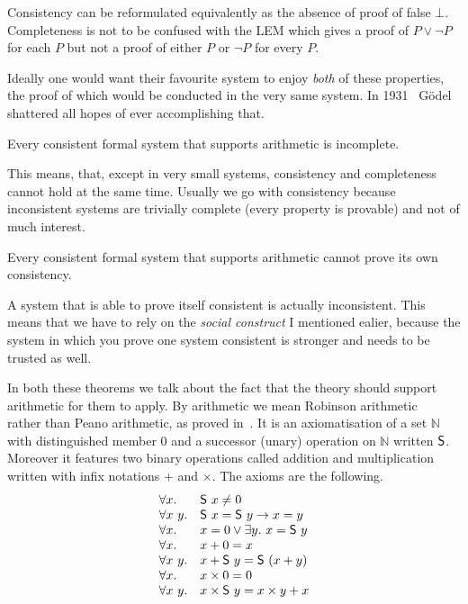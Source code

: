 Consistency can be reformulated equivalently as the absence of proof of false
\(\bot\).
Completeness is not to be confused with the \acrshort{LEM} which gives a proof
of \(P \vee \neg P\) for each \(P\) but not a proof of either \(P\) or
\(\neg P\) for every \(P\).

Ideally one would want their favourite system to enjoy \emph{both} of these
properties, the proof of which would be conducted in the very same system.
In 1931~ Gödel shattered all hopes of ever
accomplishing that.

\begin{theorem}
  Every consistent formal system that supports arithmetic is incomplete.
\end{theorem}

This means, that, except in very small systems, consistency and completeness
cannot hold at the same time. Usually we go with consistency because
inconsistent systems are trivially complete (every property is provable) and not
of much interest.

\begin{theorem}
  Every consistent formal system that supports arithmetic cannot prove its
  own consistency.
\end{theorem}
A system that is able to prove itself consistent is actually inconsistent.
This means that we have to rely on the \emph{social construct} I mentioned
ealier, because the system in which you prove one system consistent is stronger
and needs to be trusted as well.

In both these theorems we talk about the fact that the theory should support
arithmetic for them to apply. By arithmetic we mean Robinson
arithmetic~ rather than Peano arithmetic,
as proved in~.
It is an axiomatisation of a set \(\mathbb{N}\) with distinguished member
\(0\) and a successor (unary) operation on \(\mathbb{N}\) written \(\mathsf{S}\).
Moreover it features two binary operations called addition and multiplication
written with infix notations \(+\) and \(\times\).
The axioms are the following.
\[
  \begin{array}{ll}
    \forall x.& \mathsf{S}\ x \not= 0 \\
    \forall x\ y.& \mathsf{S}\ x = \mathsf{S}\ y \to x = y \\
    \forall x.& x = 0 \vee \exists y.\ x = \mathsf{S}\ y \\
    \forall x.& x + 0 = x \\
    \forall x\ y.& x + \mathsf{S}\ y = \mathsf{S}\ (x + y) \\
    \forall x.& x \times 0 = 0 \\
    \forall x\ y.& x \times \mathsf{S}\ y = x \times y + x
  \end{array}
\]

